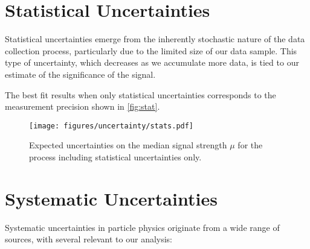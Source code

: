 \section{Statistical Uncertainties}

Statistical uncertainties emerge from the inherently stochastic nature of the data collection process, particularly due
to the limited size of our data sample. This type of uncertainty, which decreases as we accumulate more data, is tied to
our estimate of the significance of the \tth signal.

The best fit results when only statistical uncertainties corresponds to the measurement precision shown in
\autoref{fig:stat}.

\begin{figure}[h]
    \centering
    \texttt{[image: figures/uncertainty/stats.pdf]}
    \caption{Expected uncertainties on the median signal strength $\mu$ for the \tth process including statistical
        uncertainties only.}
    \label{fig:stat}
\end{figure}

\section{Systematic Uncertainties}

Systematic uncertainties in particle physics originate from a wide range of sources, with several relevant to our
analysis:

